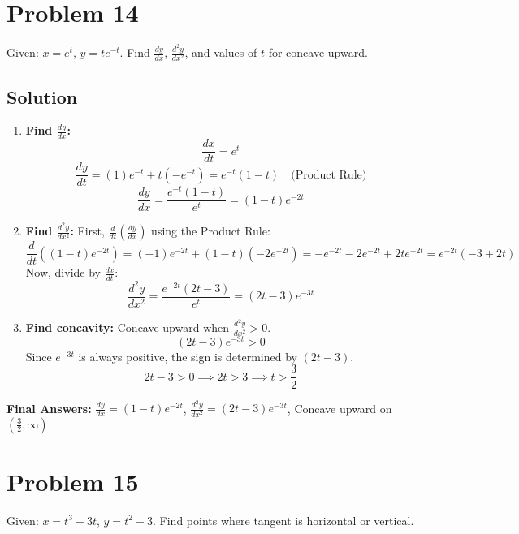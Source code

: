 \documentclass{article}
\begin{document}
\section{Problem 14}
Given: $x = e^t$, $y = te^{-t}$. Find $\frac{dy}{dx}$, $\frac{d^2y}{dx^2}$, and values of $t$ for concave upward.

\subsection*{Solution}
\begin{enumerate}
    \item \textbf{Find $\frac{dy}{dx}$:}
    \[ \frac{dx}{dt} = e^t \]
    \[ \frac{dy}{dt} = (1)e^{-t} + t(-e^{-t}) = e^{-t}(1-t) \quad \text{(Product Rule)} \]
    \[ \frac{dy}{dx} = \frac{e^{-t}(1-t)}{e^t} = (1-t)e^{-2t} \]
    \item \textbf{Find $\frac{d^2y}{dx^2}$:}
    First, $\frac{d}{dt}\left(\frac{dy}{dx}\right)$ using the Product Rule:
    \[ \frac{d}{dt}((1-t)e^{-2t}) = (-1)e^{-2t} + (1-t)(-2e^{-2t}) = -e^{-2t} - 2e^{-2t} + 2te^{-2t} = e^{-2t}(-3+2t) \]
    Now, divide by $\frac{dx}{dt}$:
    \[ \frac{d^2y}{dx^2} = \frac{e^{-2t}(2t-3)}{e^t} = (2t-3)e^{-3t} \]
    \item \textbf{Find concavity:} Concave upward when $\frac{d^2y}{dx^2} > 0$.
    \[ (2t-3)e^{-3t} > 0 \]
    Since $e^{-3t}$ is always positive, the sign is determined by $(2t-3)$.
    \[ 2t-3 > 0 \implies 2t > 3 \implies t > \frac{3}{2} \]
\end{enumerate}
\textbf{Final Answers:}
$\frac{dy}{dx} = (1-t)e^{-2t}$,
$\frac{d^2y}{dx^2} = (2t-3)e^{-3t}$,
Concave upward on $(\frac{3}{2}, \infty)$

\section{Problem 15}
Given: $x = t^3 - 3t$, $y = t^2 - 3$. Find points where tangent is horizontal or vertical.
\end{document}
